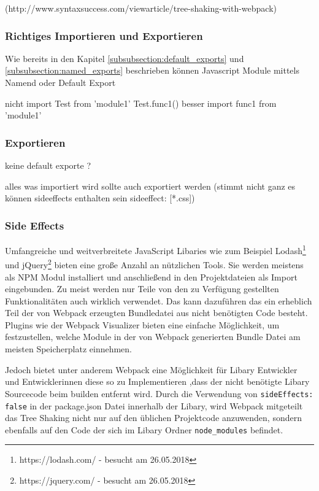 (http://www.syntaxsuccess.com/viewarticle/tree-shaking-with-webpack)

\subsubsection{Richtiges Importieren und Exportieren}

Wie bereits in den Kapitel \ref{subsubsection:default_exports} und \ref{subsubsection:named_exports} beschrieben können Javascript Module mittels Namend oder Default Export

nicht
	import Test from 'module1'
    Test.func1()
besser 
	import {func1} from 'module1'

\subsubsection{Exportieren}
keine default exporte ?

alles was importiert wird sollte auch exportiert werden (stimmt nicht ganz es können sideeffects enthalten sein sideeffect: [*.css])

\subsubsection{Side Effects}
\label{subsubsection:side_effects}
Umfangreiche und weitverbreitete JavaScript Libaries wie zum Beispiel Lodash\footnote{https://lodash.com/ - besucht am 26.05.2018} und jQuery\footnote{https://jquery.com/ - besucht am 26.05.2018} bieten eine große Anzahl an nützlichen Tools. Sie werden meistens als NPM Modul installiert und anschließend in den Projektdateien als Import eingebunden. Zu meist werden nur Teile von den zu Verfügung gestellten Funktionalitäten auch wirklich verwendet. Das kann dazuführen das ein erheblich Teil der von Webpack erzeugten Bundledatei aus nicht benötigten Code besteht. Plugins wie der Webpack Visualizer bieten eine einfache Möglichkeit, um festzustellen, welche Module in der von Webpack generierten Bundle Datei am meisten Speicherplatz einnehmen.

Jedoch bietet unter anderem Webpack eine Möglichkeit für Libary Entwickler und Entwicklerinnen diese so zu Implementieren ,dass der nicht benötigte Libary Sourcecode beim builden entfernt wird.
Durch die Verwendung von \lstinline{sideEffects: false} in der package.json Datei innerhalb der Libary, wird Webpack mitgeteilt das Tree Shaking nicht nur auf den üblichen Projektcode anzuwenden, sondern ebenfalls auf den Code der sich im Libary Ordner \lstinline{node_modules} befindet.

